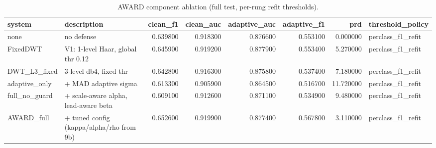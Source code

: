 \begin{table}[htbp]\centering\caption{AWARD component ablation (full test, per-rung refit thresholds).}\label{tab:ablation}
\begin{tabular}{llrrrrrl}
\toprule
system & description & clean_f1 & clean_auc & adaptive_auc & adaptive_f1 & prd & threshold_policy \\
\midrule
none & no defense & 0.639800 & 0.918300 & 0.876600 & 0.553100 & 0.000000 & perclass_f1_refit \\
FixedDWT & V1: 1-level Haar, global thr 0.12 & 0.645900 & 0.919200 & 0.877900 & 0.553400 & 5.270000 & perclass_f1_refit \\
DWT_L3_fixed & 3-level db4, fixed thr & 0.642800 & 0.916300 & 0.875800 & 0.537400 & 7.180000 & perclass_f1_refit \\
adaptive_only & + MAD adaptive sigma & 0.613300 & 0.905900 & 0.864500 & 0.516700 & 11.720000 & perclass_f1_refit \\
full_no_guard & + scale-aware alpha, lead-aware beta & 0.609100 & 0.912600 & 0.871100 & 0.534900 & 9.480000 & perclass_f1_refit \\
AWARD_full & + tuned config (kappa/alpha/rho from 9b) & 0.652600 & 0.919900 & 0.877400 & 0.567800 & 3.110000 & perclass_f1_refit \\
\bottomrule
\end{tabular}
\end{table}

